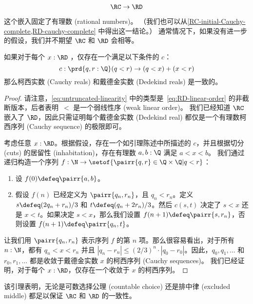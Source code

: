 \begin{equation*}
  \RC \to \RD
\end{equation*}

这个嵌入固定了有理数 (rational numbers)。
（我们也可以从\cref{RC-initial-Cauchy-complete,RD-cauchy-complete} 中得出这一结论。）
通常情况下，如果没有进一步的假设，我们并不期望 $\RC$ 和 $\RD$ 会相等。

\begin{lem} \label{lem:untruncated-linearity-reals-coincide}
如果对于每个 $x : \RD$ ，仅存在一个满足以下条件的 $c$：
\begin{equation}
  \label{eq:untruncated-linearity}
  c : \prd{q, r : \Q} (q < r) \to (q < x) + (x < r)
\end{equation}
那么柯西实数 (Cauchy reals) 和戴德金实数 (Dedekind reals) 是一致的。
\end{lem}

\begin{proof}
  请注意，\eqref{eq:untruncated-linearity} 中的类型是~\eqref{eq:RD-linear-order} 的非截断版本，后者表明~$<$ 是一个弱线性序 (weak linear order)。
  我们已经知道 $\RC$ 嵌入了 $\RD$，因此只需证明每个戴德金实数 (Dedekind real) 都仅是一个有理数柯西序列 (Cauchy sequence) 的极限即可。

  考虑任意 $x : \RD$。根据假设，存在一个如引理陈述中所描述的 $c$，并且根据切分 (cuts) 的居留性 (inhabitation)，存在有理数 $a, b : \Q$ 满足 $a < x < b$。
  我们通过递归构造一个序列 $f : \N \to \setof{ \pairr{q, r} \in \Q \times \Q | q < r }$：
  \begin{enumerate}
    \item 设 $f(0) \defeq \pairr{a, b}$。
    \item 假设 $f(n)$ 已经定义为 $\pairr{q_n, r_n}$，且 $q_n < r_n$。定义 $s \defeq (2 q_n + r_n)/3$ 和 $t \defeq (q_n + 2 r_n)/3$。然后 $c(s,t)$ 决定了 $s < x$ 还是 $x < t$。如果决定 $s < x$，那么我们设置 $f(n+1) \defeq \pairr{s, r_n}$，否则设置 $f(n+1) \defeq \pairr{q_n, t}$。
  \end{enumerate}

  让我们用 $\pairr{q_n, r_n}$ 表示序列 $f$ 的第 $n$ 项。那么很容易看出，对于所有 $n : \N$，都有 $q_n < x < r_n$ 并且 $|q_n - r_n| \leq (2/3)^n \cdot |q_0 - r_0|$。因此，$q_0, q_1, \ldots$ 和 $r_0, r_1, \ldots$ 都是收敛于戴德金实数 $x$ 的柯西序列 (Cauchy sequences)。
  我们已经证明，对于每个 $x : \RD$，仅存在一个收敛于 $x$ 的柯西序列。
\end{proof}

该引理表明，无论是可数选择公理 (countable choice) 还是排中律 (excluded middle) 都足以保证 $\RC$ 和 $\RD$ 的一致性。

